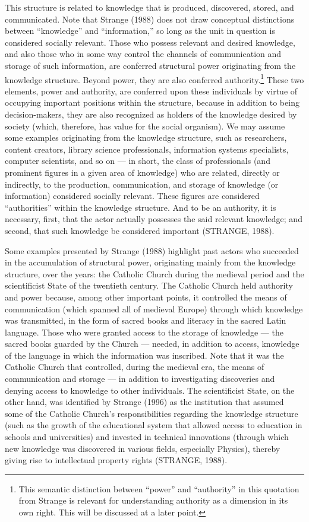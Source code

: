 This structure is related to knowledge that is produced, discovered, stored, and communicated. Note that Strange (1988) does not draw conceptual distinctions between ``knowledge'' and ``information,'' so long as the unit in question is considered socially relevant. Those who possess relevant and desired knowledge, and also those who in some way control the channels of communication and storage of such information, are conferred structural power originating from the knowledge structure. Beyond power, they are also conferred authority.\footnote{This semantic distinction between ``power'' and ``authority'' in this quotation from Strange is relevant for understanding authority as a dimension in its own right. This will be discussed at a later point.} These two elements, power and authority, are conferred upon these individuals by virtue of occupying important positions within the structure, because in addition to being decision-makers, they are also recognized as holders of the knowledge desired by society (which, therefore, has value for the social organism). We may assume some examples originating from the knowledge structure, such as researchers, content creators, library science professionals, information systems specialists, computer scientists, and so on --- in short, the class of professionals (and prominent figures in a given area of knowledge) who are related, directly or indirectly, to the production, communication, and storage of knowledge (or information) considered socially relevant. These figures are considered ``authorities'' within the knowledge structure. And to be an authority, it is necessary, first, that the actor actually possesses the said relevant knowledge; and second, that such knowledge be considered important (STRANGE, 1988).

Some examples presented by Strange (1988) highlight past actors who succeeded in the accumulation of structural power, originating mainly from the knowledge structure, over the years: the Catholic Church during the medieval period and the scientificist State of the twentieth century. The Catholic Church held authority and power because, among other important points, it controlled the means of communication (which spanned all of medieval Europe) through which knowledge was transmitted, in the form of sacred books and literacy in the sacred Latin language. Those who were granted access to the storage of knowledge --- the sacred books guarded by the Church --- needed, in addition to access, knowledge of the language in which the information was inscribed. Note that it was the Catholic Church that controlled, during the medieval era, the means of communication and storage --- in addition to investigating discoveries and denying access to knowledge to other individuals. The scientificist State, on the other hand, was identified by Strange (1996) as the institution that assumed some of the Catholic Church's responsibilities regarding the knowledge structure (such as the growth of the educational system that allowed access to education in schools and universities) and invested in technical innovations (through which new knowledge was discovered in various fields, especially Physics), thereby giving rise to intellectual property rights (STRANGE, 1988).

